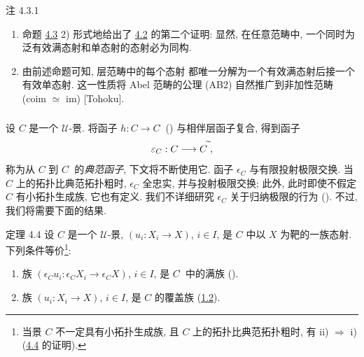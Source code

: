 \begin{enonce*}[remark]{注 4.3.1}
\begin{enumerate}
\renewcommand{\labelenumi}{\theenumi)}
\item 命题\pageoriginale{} \hyperref[II.prop4.3]{4.3} 2)
形式地给出了 \hyperref[II.prop4.2]{4.2} 的第二个证明:
显然, 在任意范畴中, 一个同时为泛有效满态射和单态射的态射必为同构.

\item 由前述命题可知, 层范畴中的每个态射
都唯一分解为一个有效满态射后接一个有效单态射.
这一性质将 Abel 范畴的公理 (AB2) 自然推广到非加性范畴
(coim $\simeq$ im) [Tohoku].
\end{enumerate}
\end{enonce*}

\setcounter{subsection}{4} \setcounter{subsubsection}{-1}



\subsubsection{}
设 $C$ 是一个 $𝒰$-景.
将函子 $h:C\rightarrow
C^{\widehat{\phantom{,}}}$ ()
与相伴层函子复合, 得到函子$$
\varepsilon_C:C\longrightarrow C^{\widetilde{\phantom{,}}}{},
$$
称为从 $C$ 到 $C^{\widetilde{\phantom{,}}}$ 的\emph{典范函子},
下文将不断使用它.
函子 $\epsilon_C$ 与有限投射极限交换.
当 $C$ 上的拓扑比典范拓扑粗时,
$\epsilon_C$ 全忠实, 并与投射极限交换;
此外, 此时即使不假定 $C$ 有小拓扑生成族, 它也有定义.
我们不详细研究 $\epsilon_C$ 关于归纳极限的行为
(\cf [SGA 3 IV]). 不过, 我们将需要下面的结果.

\begin{enonce*}{定理 4.4}
设 $C$ 是一个 $𝒰$-景,
$(u_i:X_i\rightarrow X)$, $i\in I$, 是 $C$ 中以 $X$ 为靶的一族态射.
下列条件等价\footnote[1]{当景 $C$ 不一定具有小拓扑生成族,
且 $C$ 上的拓扑比典范拓扑粗时, 有
ii) $\Rightarrow$ i) (\cf \hyperref[II.theo4.4]{4.4} 的证明).}:
\begin{enumerate}
\renewcommand{\theenumi}{\roman{enumi}}
\renewcommand{\labelenumi}{\theenumi)}
\item 族 $(\epsilon_C u_i:\epsilon_C X_i\rightarrow \epsilon_C
  X)$, $i\in I$, 是 $C^{\widetilde{\phantom{,}}}$ 中的满族
{\rm().}\pageoriginale

\item 族 $(u_i:X_i\rightarrow X)$, $i\in I$,
是 $C$ 的覆盖族 (\hyperref[II.def1.2]{1.2}).
\end{enumerate}
\end{enonce*}

